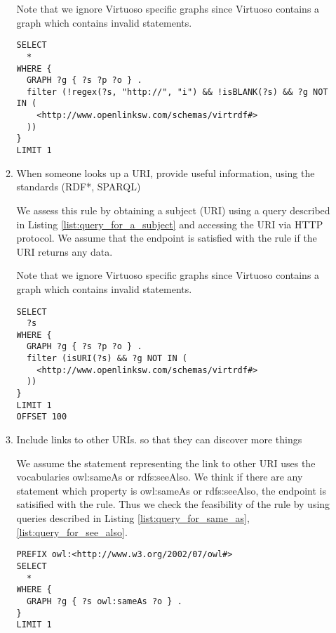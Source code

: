 \documentclass[11pt,a4paper]{article}
\begin{document}
\begin{itemize}
\begin{enumerate}
      Note that we ignore Virtuoso specific graphs since Virtuoso contains a graph which contains invalid statements.

      \begin{lstlisting}[basicstyle=\ttfamily\footnotesize,breaklines=true,frame=single,caption=A Query for searching non-HTTP-URI subjects,label=list:non_http_uri_subject]
SELECT
  *
WHERE {
  GRAPH ?g { ?s ?p ?o } .
  filter (!regex(?s, "http://", "i") && !isBLANK(?s) && ?g NOT IN (
    <http://www.openlinksw.com/schemas/virtrdf#>
  ))
}
LIMIT 1
      \end{lstlisting}

      \item When someone looks up a URI, provide useful information, using the standards (RDF*, SPARQL)

      We assess this rule by obtaining a subject (URI) using a query described in Listing \ref{list:query_for_a_subject} and accessing the URI via HTTP protocol. We assume that the endpoint is satisfied with the rule if the URI returns any data.

      Note that we ignore Virtuoso specific graphs since Virtuoso contains a graph which contains invalid statements.

      \begin{lstlisting}[basicstyle=\ttfamily\footnotesize,breaklines=true,frame=single,caption=A Query for a Subject,label=list:query_for_a_subject]
SELECT
  ?s
WHERE {
  GRAPH ?g { ?s ?p ?o } .
  filter (isURI(?s) && ?g NOT IN (
    <http://www.openlinksw.com/schemas/virtrdf#>
  ))
}
LIMIT 1
OFFSET 100
      \end{lstlisting}

      \item Include links to other URIs. so that they can discover more things

      We assume the statement representing the link to other URI uses the vocabularies owl:sameAs or rdfs:seeAlso. We think if there are any statement which property is owl:sameAs or rdfs:seeAlso, the endpoint is satisified with the rule.
      Thus we check the feasibility of the rule by using queries described in Listing \ref{list:query_for_same_as}, \ref{list:query_for_see_also}.

      \begin{lstlisting}[basicstyle=\ttfamily\footnotesize,breaklines=true,frame=single,caption=A Query for a Same AS Statement,label=list:query_for_same_as]
PREFIX owl:<http://www.w3.org/2002/07/owl#>
SELECT
  *
WHERE {
  GRAPH ?g { ?s owl:sameAs ?o } .
}
LIMIT 1
      \end{lstlisting}


\end{enumerate}
\end{itemize}
\end{document}

